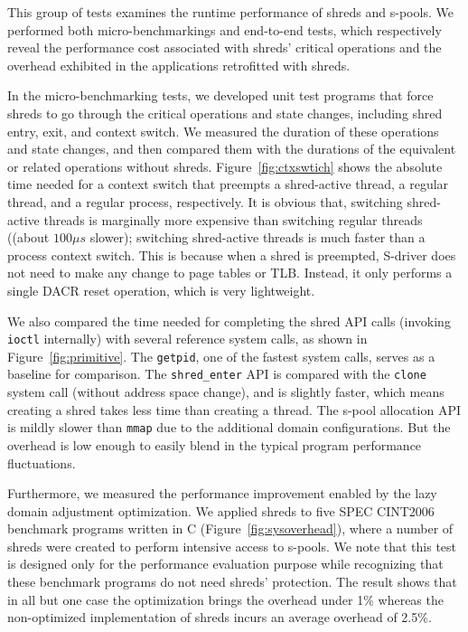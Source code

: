     
This group of tests examines the runtime performance of shreds and s-pools. We performed both micro-benchmarkings and end-to-end tests, which respectively reveal the performance cost associated with shreds' critical operations and the overhead exhibited in the \numopensource applications retrofitted with shreds. 

In the micro-benchmarking tests, we developed unit test programs that force shreds to go through the critical operations and state changes, including shred entry, exit, and context switch. We measured the duration of these operations and state changes, and then compared them with the durations of the equivalent or related operations without shreds. Figure~\ref{fig:ctxswtich} shows the absolute time needed for a context switch that preempts a shred-active thread, a regular thread, and a regular process, respectively.   It is obvious that, switching shred-active threads is marginally more expensive than switching  regular threads ((about $100\mu s$ slower); switching shred-active threads is much faster than a process context switch. 
This is because when a shred is preempted, S-driver does not need to make any change to page tables or TLB. Instead, it only performs a single DACR reset operation, which is very lightweight. 

We also compared the time needed for completing the shred API calls (invoking {\tt ioctl} internally) with several reference system calls, as shown in Figure~\ref{fig:primitive}. The {\tt getpid}, one of the fastest system calls,  serves as a baseline for comparison. The {\tt shred\_enter} API is compared with the {\tt clone} system call (without address space change), and is slightly faster, which means creating a shred takes less time than creating a thread. The s-pool allocation API is mildly slower than {\tt mmap} due to the additional domain configurations.  But the overhead is low enough to easily blend in the typical  program performance fluctuations. 

Furthermore, we measured the performance improvement enabled by the lazy domain adjustment optimization. We applied shreds to five SPEC CINT2006 benchmark programs written in C (Figure~\ref{fig:sysoverhead}), where a number of shreds were created to perform intensive access to s-pools. We note that this test is designed only for the performance evaluation purpose while recognizing that these benchmark programs do not need shreds' protection. The result shows that in all but one case the optimization brings the overhead under 1\% whereas the non-optimized implementation of shreds incurs an average overhead of 2.5\%. 

